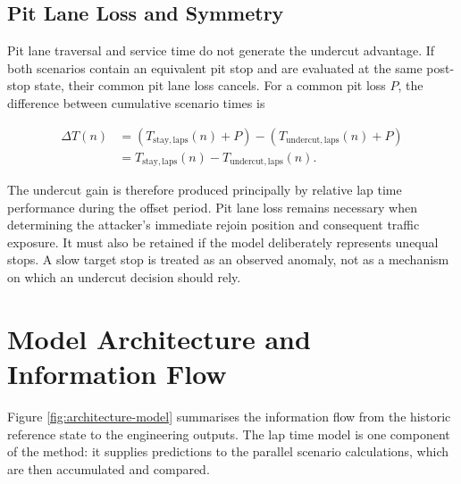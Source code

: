 
\subsection{Pit Lane Loss and Symmetry}
\label{sec:pit-loss}

Pit lane traversal and service time do not generate the undercut advantage. If
both scenarios contain an equivalent pit stop and are evaluated at the same
post-stop state, their common pit lane loss cancels. For a common pit loss
$P$, the difference between cumulative scenario times is

\begin{equation}
\begin{split}
\Delta T(n)
&= \left(T_{\mathrm{stay,laps}}(n)+P\right)
 - \left(T_{\mathrm{undercut,laps}}(n)+P\right) \\
&= T_{\mathrm{stay,laps}}(n)-T_{\mathrm{undercut,laps}}(n).
\end{split}
\label{eq:pit-loss-cancellation}
\end{equation}

The undercut gain is therefore produced principally by relative lap time
performance during the offset period. Pit lane loss remains necessary when
determining the attacker's immediate rejoin position and consequent traffic
exposure. It must also be retained if the model deliberately represents unequal
stops. A slow target stop is treated as an observed anomaly, not as a mechanism
on which an undercut decision should rely.

\section{Model Architecture and Information Flow}
\label{subsec:model-architecture}

Figure \ref{fig:architecture-model} summarises the information flow from the
historic reference state to the engineering outputs. The lap time model is one
component of the method: it supplies predictions to the parallel scenario
calculations, which are then accumulated and compared.


